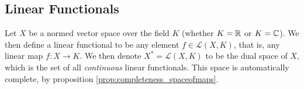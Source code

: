 \subsection{Linear Functionals}

Let $X$ be a normed vector space over the field $K$ (whether $K = \mathbb{R}$ or $K = \mathbb{C}$). We then define a linear functional to be any element \mbox{$f\in \mathcal{L}(X,K)$,} that is, any linear map \mbox{$f : X \to K$.} We then denote \mbox{$X^{*} = \mathcal{L}(X,K)$} to be the dual space of $X$, which is the set of all \emph{continuous} linear functionals. This space is automatically complete, by proposition \ref{prop:completeness_spaceofmaps}.


